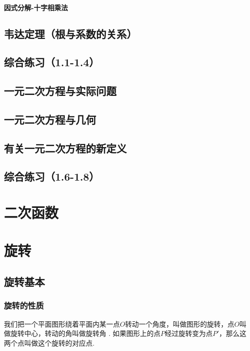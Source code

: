 \documentclass[lang=cn, 10pt, titlestyle=hang, oneside]{elegantbook}
\begin{document}
\subsubsection{因式分解-十字相乘法}


\section{韦达定理（根与系数的关系）}

\section{综合练习（1.1-1.4）}

\section{一元二次方程与实际问题}

\section{一元二次方程与几何}

\section{有关一元二次方程的新定义}

\section{综合练习（1.6-1.8）}

\chapter{二次函数}

\chapter{旋转}

\section{旋转基本}

\subsection{旋转的性质}

我们把一个平面图形绕着平面内某一点\(O \)转动一个角度，叫做图形的旋转，点\(O \)叫做旋转中心，转动的角叫做旋转角 . 如果图形上的点\(P \)经过旋转变为点\(P' \)，那么这两个点叫做这个旋转的对应点.
\end{document}
